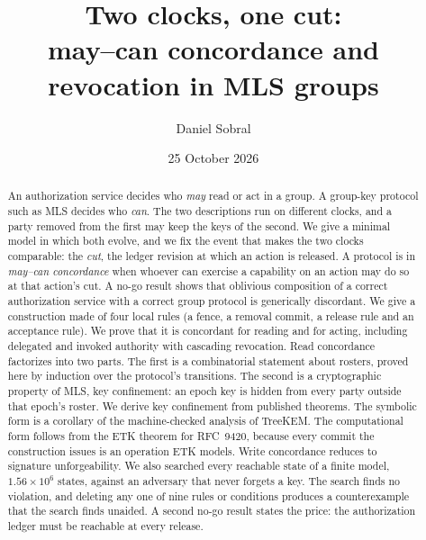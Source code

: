 \documentclass[aps,prx,reprint,superscriptaddress,nofootinbib,floatfix]{revtex4-2}
\theoremstyle{remark}
\begin{document}
\title{Two clocks, one cut:\\ may--can concordance and revocation in MLS groups}

\author{Daniel Sobral}

\date{25 October 2026}

\begin{abstract}
An authorization service decides who \emph{may} read or act in a group. A group-key protocol such as MLS decides who \emph{can}. The two descriptions run on different clocks, and a party removed from the first may keep the keys of the second. We give a minimal model in which both evolve, and we fix the event that makes the two clocks comparable: the \emph{cut}, the ledger revision at which an action is released. A protocol is in \emph{may--can concordance} when whoever can exercise a capability on an action may do so at that action's cut. A no-go result shows that oblivious composition of a correct authorization service with a correct group protocol is generically discordant. We give a construction made of four local rules (a fence, a removal commit, a release rule and an acceptance rule). We prove that it is concordant for reading and for acting, including delegated and invoked authority with cascading revocation. Read concordance factorizes into two parts. The first is a combinatorial statement about rosters, proved here by induction over the protocol's transitions. The second is a cryptographic property of MLS, key confinement: an epoch key is hidden from every party outside that epoch's roster. We derive key confinement from published theorems. The symbolic form is a corollary of the machine-checked analysis of TreeKEM. The computational form follows from the ETK theorem for RFC~9420, because every commit the construction issues is an operation ETK models. Write concordance reduces to signature unforgeability. We also searched every reachable state of a finite model, $1.56\times10^6$ states, against an adversary that never forgets a key. The search finds no violation, and deleting any one of nine rules or conditions produces a counterexample that the search finds unaided. A second no-go result states the price: the authorization ledger must be reachable at every release.
\end{abstract}

\maketitle
\end{document}
